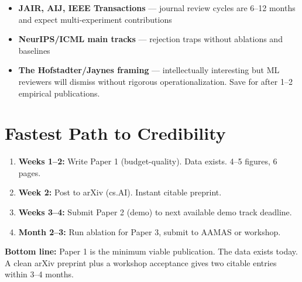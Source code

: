 \documentclass[11pt,letterpaper]{article}
\begin{document}
\begin{itemize}
\item \textbf{JAIR, AIJ, IEEE Transactions} --- journal review cycles are 6--12 months and expect multi-experiment contributions
\item \textbf{NeurIPS/ICML main tracks} --- rejection traps without ablations and baselines
\item \textbf{The Hofstadter/Jaynes framing} --- intellectually interesting but ML reviewers will dismiss without rigorous operationalization. Save for after 1--2 empirical publications.
\end{itemize}

\section{Fastest Path to Credibility}

\begin{enumerate}
\item \textbf{Weeks 1--2:} Write Paper 1 (budget-quality). Data exists. 4--5 figures, 6 pages.
\item \textbf{Week 2:} Post to arXiv (cs.AI). Instant citable preprint.
\item \textbf{Weeks 3--4:} Submit Paper 2 (demo) to next available demo track deadline.
\item \textbf{Month 2--3:} Run ablation for Paper 3, submit to AAMAS or workshop.
\end{enumerate}

\textbf{Bottom line:} Paper 1 is the minimum viable publication. The data exists today. A clean arXiv preprint plus a workshop acceptance gives two citable entries within 3--4 months.
\end{document}
